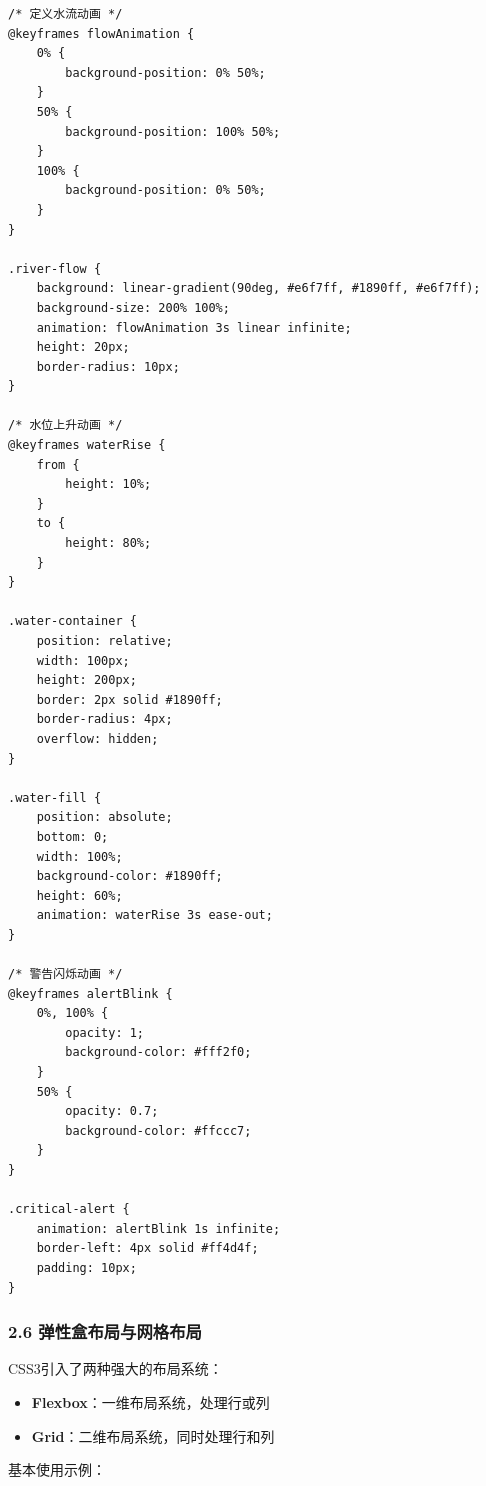 \begin{lstlisting}
/* 定义水流动画 */
@keyframes flowAnimation {
    0% {
        background-position: 0% 50%;
    }
    50% {
        background-position: 100% 50%;
    }
    100% {
        background-position: 0% 50%;
    }
}

.river-flow {
    background: linear-gradient(90deg, #e6f7ff, #1890ff, #e6f7ff);
    background-size: 200% 100%;
    animation: flowAnimation 3s linear infinite;
    height: 20px;
    border-radius: 10px;
}

/* 水位上升动画 */
@keyframes waterRise {
    from {
        height: 10%;
    }
    to {
        height: 80%;
    }
}

.water-container {
    position: relative;
    width: 100px;
    height: 200px;
    border: 2px solid #1890ff;
    border-radius: 4px;
    overflow: hidden;
}

.water-fill {
    position: absolute;
    bottom: 0;
    width: 100%;
    background-color: #1890ff;
    height: 60%;
    animation: waterRise 3s ease-out;
}

/* 警告闪烁动画 */
@keyframes alertBlink {
    0%, 100% {
        opacity: 1;
        background-color: #fff2f0;
    }
    50% {
        opacity: 0.7;
        background-color: #ffccc7;
    }
}

.critical-alert {
    animation: alertBlink 1s infinite;
    border-left: 4px solid #ff4d4f;
    padding: 10px;
}
\end{lstlisting}

\subsubsection{2.6
弹性盒布局与网格布局}\label{ux5f39ux6027ux76d2ux5e03ux5c40ux4e0eux7f51ux683cux5e03ux5c40}

CSS3引入了两种强大的布局系统：

\begin{itemize}
\tightlist
\item
  \textbf{Flexbox}：一维布局系统，处理行或列
\item
  \textbf{Grid}：二维布局系统，同时处理行和列
\end{itemize}

基本使用示例：

